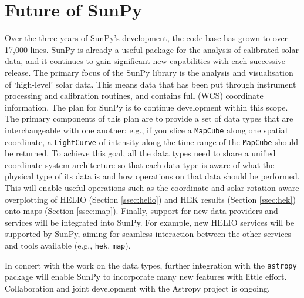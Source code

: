 \section{Future of SunPy}\label{sec:future}

Over the three years of SunPy's development, the code base has grown to over 17,000 lines. 
SunPy is already a 
useful package for the analysis of calibrated solar data, and it
continues to gain significant new capabilities with each successive release.
The primary focus of the 
SunPy library is the analysis and visualisation of `high-level' solar 
data. This means data that has been put through instrument processing 
and 
calibration routines, and contains full (WCS) coordinate information. 
The plan for SunPy is to continue development within this 
scope. The 
primary components of this plan are to provide a set of data types 
that are 
interchangeable with one another: e.g., if you slice a 
\texttt{MapCube} 
along one spatial coordinate, a \texttt{LightCurve} of intensity along the 
time range of 
the \texttt{MapCube} should be returned. To achieve this goal, all the 
data 
types need to share a unified coordinate system architecture so that 
each data 
type is aware of what the physical type of its data is and how 
operations on 
that data should be performed. This will enable useful operations
such as the coordinate and solar-rotation-aware 
overplotting of HELIO (Section \ref{ssec:helio}) and HEK
results (Section \ref{ssec:hek}) onto maps (Section \ref{ssec:map}).
Finally, support for new data providers and services will be integrated into SunPy.
For example, new HELIO services will be supported by SunPy, aiming for
seamless interaction between the other services and tools available (e.g., 
\texttt{hek}, \texttt{map}).  

In concert with the work on the data types, further integration with 
the 
\texttt{astropy} package will enable SunPy to incorporate many new features
with little effort. Collaboration and joint development with the 
Astropy project \citep{theastropycollaboration2013} is ongoing.
